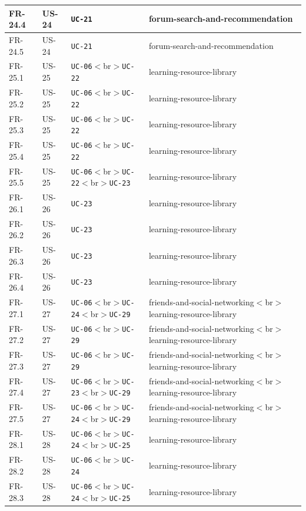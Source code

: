 \documentclass[12pt]{article}
\begin{document}
\begin{longtable}{|>{\raggedright\arraybackslash}p{}|>{\raggedright\arraybackslash}p{}|>{\raggedright\arraybackslash}p{}|>{\raggedright\arraybackslash}p{}|}
FR-24.4 & US-24 & \texttt{UC-21} & forum-search-and-recommendation \\ \hline
FR-24.5 & US-24 & \texttt{UC-21} & forum-search-and-recommendation \\ \hline
FR-25.1 & US-25 & \texttt{UC-06}$<$br$>$\texttt{UC-22} & learning-resource-library \\ \hline
FR-25.2 & US-25 & \texttt{UC-06}$<$br$>$\texttt{UC-22} & learning-resource-library \\ \hline
FR-25.3 & US-25 & \texttt{UC-06}$<$br$>$\texttt{UC-22} & learning-resource-library \\ \hline
FR-25.4 & US-25 & \texttt{UC-06}$<$br$>$\texttt{UC-22} & learning-resource-library \\ \hline
FR-25.5 & US-25 & \texttt{UC-06}$<$br$>$\texttt{UC-22}$<$br$>$\texttt{UC-23} & learning-resource-library \\ \hline
FR-26.1 & US-26 & \texttt{UC-23} & learning-resource-library \\ \hline
FR-26.2 & US-26 & \texttt{UC-23} & learning-resource-library \\ \hline
FR-26.3 & US-26 & \texttt{UC-23} & learning-resource-library \\ \hline
FR-26.4 & US-26 & \texttt{UC-23} & learning-resource-library \\ \hline
FR-27.1 & US-27 & \texttt{UC-06}$<$br$>$\texttt{UC-24}$<$br$>$\texttt{UC-29} & friends-and-social-networking$<$br$>$learning-resource-library \\ \hline
FR-27.2 & US-27 & \texttt{UC-06}$<$br$>$\texttt{UC-29} & friends-and-social-networking$<$br$>$learning-resource-library \\ \hline
FR-27.3 & US-27 & \texttt{UC-06}$<$br$>$\texttt{UC-29} & friends-and-social-networking$<$br$>$learning-resource-library \\ \hline
FR-27.4 & US-27 & \texttt{UC-06}$<$br$>$\texttt{UC-23}$<$br$>$\texttt{UC-29} & friends-and-social-networking$<$br$>$learning-resource-library \\ \hline
FR-27.5 & US-27 & \texttt{UC-06}$<$br$>$\texttt{UC-24}$<$br$>$\texttt{UC-29} & friends-and-social-networking$<$br$>$learning-resource-library \\ \hline
FR-28.1 & US-28 & \texttt{UC-06}$<$br$>$\texttt{UC-24}$<$br$>$\texttt{UC-25} & learning-resource-library \\ \hline
FR-28.2 & US-28 & \texttt{UC-06}$<$br$>$\texttt{UC-24} & learning-resource-library \\ \hline
FR-28.3 & US-28 & \texttt{UC-06}$<$br$>$\texttt{UC-24}$<$br$>$\texttt{UC-25} & learning-resource-library \\ \hline

\end{longtable}
\end{document}

